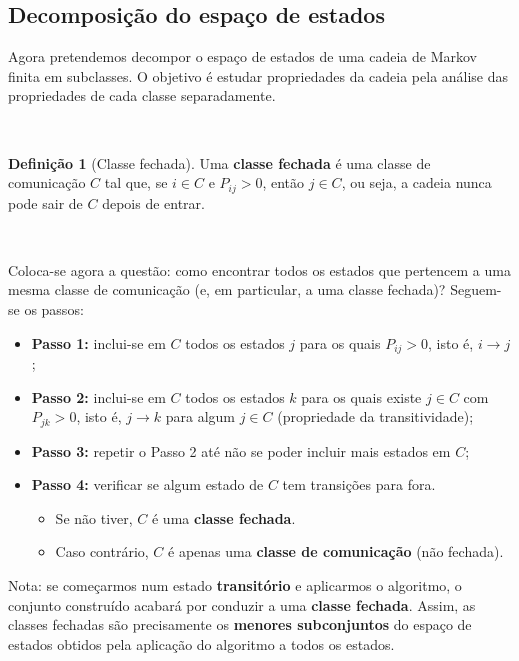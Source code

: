 \documentclass[
  11pt,
  a4paper,
]{book}
\providecommand{\tightlist}{%
  \setlength{\itemsep}{0pt}\setlength{\parskip}{0pt}}
\theoremstyle{definition}
\newtheorem{definition}{Definição}[chapter]
\theoremstyle{definition}
\theoremstyle{definition}
\theoremstyle{definition}
\theoremstyle{remark}
\begin{document}
\subsection{Decomposição do espaço de estados}\label{decomposicao-do-espaco-de-estados}

Agora pretendemos decompor o espaço de estados de uma cadeia de Markov finita em subclasses. O objetivo é estudar propriedades da cadeia pela análise das propriedades de cada classe separadamente.

\(\,\)

\begin{definition}[Classe fechada]
Uma \textbf{classe fechada} é uma classe de comunicação \(C\) tal que, se \(i \in C\) e \(P_{ij} > 0\), então \(j \in C\), ou seja, a cadeia nunca pode sair de \(C\) depois de entrar.
\end{definition}

\(\,\)

Coloca-se agora a questão: como encontrar todos os estados que pertencem a uma mesma classe de comunicação (e, em particular, a uma classe fechada)? Seguem-se os passos:

\begin{itemize}
\item
  \textbf{Passo 1:} inclui-se em \(C\) todos os estados \(j\) para os quais \(P_{ij}>0\), isto é, \(i \longrightarrow j\);
\item
  \textbf{Passo 2:} inclui-se em \(C\) todos os estados \(k\) para os quais existe \(j \in C\) com \(P_{jk}>0\), isto é, \(j \longrightarrow k\) para algum \(j \in C\) (propriedade da transitividade);
\item
  \textbf{Passo 3:} repetir o Passo 2 até não se poder incluir mais estados em \(C\);
\item
  \textbf{Passo 4:} verificar se algum estado de \(C\) tem transições para fora.

  \begin{itemize}
  \tightlist
  \item
    Se não tiver, \(C\) é uma \textbf{classe fechada}.\\
  \item
    Caso contrário, \(C\) é apenas uma \textbf{classe de comunicação} (não fechada).
  \end{itemize}
\end{itemize}

Nota: se começarmos num estado \textbf{transitório} e aplicarmos o algoritmo, o conjunto construído acabará por conduzir a uma \textbf{classe fechada}. Assim, as classes fechadas são precisamente os \textbf{menores subconjuntos} do espaço de estados obtidos pela aplicação do algoritmo a todos os estados.
\end{document}
